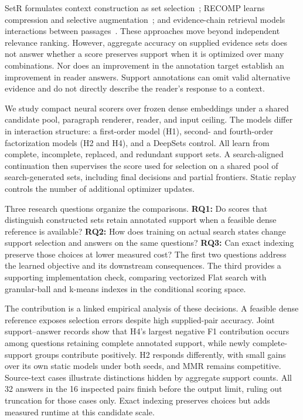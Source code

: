 \documentclass[preprint,12pt]{elsarticle}
\begin{document}
SetR formulates context construction as set selection~\cite{lee2025setr}; RECOMP learns compression and selective augmentation~\cite{xu2024recomp}; and evidence-chain retrieval models interactions between passages~\cite{zhang2024beam,guo2025interchunk}. These approaches move beyond independent relevance ranking. However, aggregate accuracy on supplied evidence sets does not answer whether a score preserves support when it is optimized over many combinations. Nor does an improvement in the annotation target establish an improvement in reader answers. Support annotations can omit valid alternative evidence and do not directly describe the reader's response to a context.

We study compact neural scorers over frozen dense embeddings under a shared candidate pool, paragraph renderer, reader, and input ceiling. The models differ in interaction structure: a first-order model (H1), second- and fourth-order factorization models (H2 and H4), and a DeepSets control. All learn from complete, incomplete, replaced, and redundant support sets. A search-aligned continuation then supervises the score used for selection on a shared pool of search-generated sets, including final decisions and partial frontiers. Static replay controls the number of additional optimizer updates.

Three research questions organize the comparisons. \textbf{RQ1:} Do scores that distinguish constructed sets retain annotated support when a feasible dense reference is available? \textbf{RQ2:} How does training on actual search states change support selection and answers on the same questions? \textbf{RQ3:} Can exact indexing preserve those choices at lower measured cost? The first two questions address the learned objective and its downstream consequences. The third provides a supporting implementation check, comparing vectorized Flat search with granular-ball and k-means indexes in the conditional scoring space.

The contribution is a linked empirical analysis of these decisions. A feasible dense reference exposes selection errors despite high supplied-pair accuracy. Joint support--answer records show that H4's largest negative F1 contribution occurs among questions retaining complete annotated support, while newly complete-support groups contribute positively. H2 responds differently, with small gains over its own static models under both seeds, and MMR remains competitive. Source-text cases illustrate distinctions hidden by aggregate support counts. All 32 answers in the 16 inspected pairs finish before the output limit, ruling out truncation for those cases only. Exact indexing preserves choices but adds measured runtime at this candidate scale.
\end{document}
